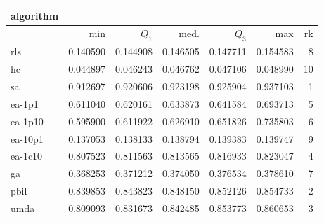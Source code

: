 \begin{tabular}{@{}l*{5}{>{{}}N{1}{3}}>{{}}N{2}{0}@{}}
\toprule
{algorithm} &  \\
\midrule
& {min} & {$Q_1$} & {med.} & {$Q_3$} & {max} & {rk}\\
\midrule
rls & 0.140590 & 0.144908 & 0.146505 & 0.147711 & 0.154583 & 8\\
hc & 0.044897 & 0.046243 & 0.046762 & 0.047106 & 0.048990 & 10\\
sa & {\color{blue}} 0.912697 & {\color{blue}} 0.920606 & {\color{blue}} 0.923198 & {\color{blue}} 0.925904 & {\color{blue}} 0.937103 & 1\\
ea-1p1 & 0.611040 & 0.620161 & 0.633873 & 0.641584 & 0.693713 & 5\\
ea-1p10 & 0.595900 & 0.611922 & 0.626910 & 0.651826 & 0.735803 & 6\\
ea-10p1 & 0.137053 & 0.138133 & 0.138794 & 0.139383 & 0.139747 & 9\\
ea-1c10 & 0.807523 & 0.811563 & 0.813565 & 0.816933 & 0.823047 & 4\\
ga & 0.368253 & 0.371212 & 0.374050 & 0.376534 & 0.378610 & 7\\
pbil & 0.839853 & 0.843823 & 0.848150 & 0.852126 & 0.854733 & 2\\
umda & 0.809093 & 0.831673 & 0.842485 & 0.853773 & 0.860653 & 3\\
\bottomrule
\end{tabular}
